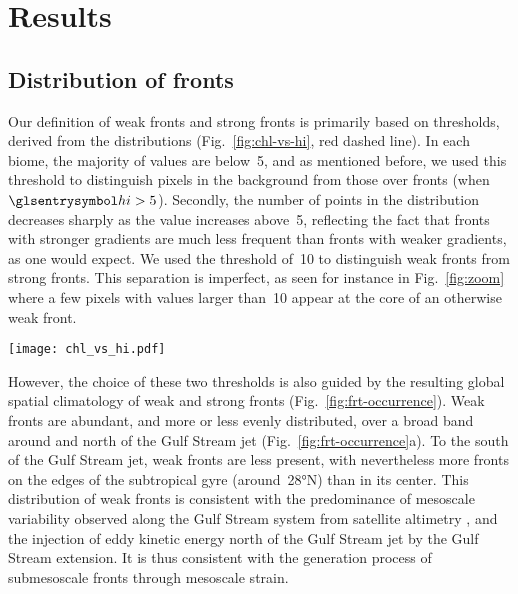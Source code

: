 \section{Results}

\subsection{Distribution of fronts}

Our definition of weak fronts and strong fronts is primarily based on thresholds, derived from the  distributions (Fig.~\ref{fig:chl-vs-hi}, red dashed line).
In each biome, the majority of  values are below~5, and as mentioned before, we used this threshold to distinguish pixels in the background from those over fronts (when \(\am{hi} > 5\)).
Secondly, the number of points in the  distribution decreases sharply as the  value increases above~5, reflecting the fact that fronts with stronger  gradients are much less frequent than fronts with weaker gradients, as one would expect.
We used the  threshold of~10 to distinguish weak fronts from strong fronts.
This separation is imperfect, as seen for instance in Fig.~\ref{fig:zoom} where a few pixels with  values larger than~10 appear at the core of an otherwise weak front.

\begin{figure*}
  \texttt{[image: chl\_vs\_hi.pdf]}
  \caption{
    Normalized distribution of the Heterogeneity Index~(, red dashed line) within each biome, and distribution of  as a function of  (representing front strength), over the full period 2000--2020.
    Shown are the median value of the  distributions (solid black line), and 1st and 3rd quartiles (dashed lines).
    Note that~ of pixels have outstanding large  values and are not included here.
  }%
  \label{fig:chl-vs-hi}
\end{figure*}

However, the choice of these two  thresholds is also guided by the resulting global spatial climatology of weak and strong fronts (Fig.~\ref{fig:frt-occurrence}).
Weak fronts are abundant, and more or less evenly distributed, over a broad band around and north of the Gulf Stream jet (Fig.~\ref{fig:frt-occurrence}a).
To the south of the Gulf Stream jet, weak fronts are less present, with nevertheless more fronts on the edges of the subtropical gyre (around~\ang{28}N) than in its center.
This distribution of weak fronts is consistent with the predominance of mesoscale variability observed along the Gulf Stream system from satellite altimetry \parencite{zhai_2008}, and the injection of eddy kinetic energy north of the Gulf Stream jet by the Gulf Stream extension.
It is thus consistent with the generation process of submesoscale fronts through mesoscale strain.


